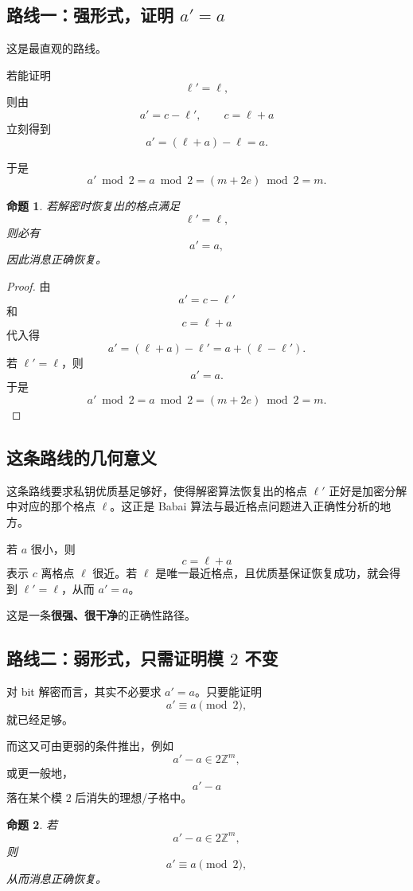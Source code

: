 \documentclass[12pt,a4paper]{article}
\newtheorem{proposition}{命题}
\begin{document}
\subsection{路线一：强形式，证明 \(a'=a\)}

这是最直观的路线。

若能证明
\[
\ell'=\ell,
\]
则由
\[
a' = c-\ell',\qquad c=\ell+a
\]
立刻得到
\[
a' = (\ell+a)-\ell = a.
\]

于是
\[
a'\bmod 2 = a\bmod 2 = (m+2e)\bmod 2 = m.
\]

\begin{proposition}
若解密时恢复出的格点满足
\[
\ell'=\ell,
\]
则必有
\[
a'=a,
\]
因此消息正确恢复。
\end{proposition}

\begin{proof}
由
\[
a' = c-\ell'
\]
和
\[
c=\ell+a
\]
代入得
\[
a' = (\ell+a)-\ell' = a+(\ell-\ell').
\]
若 \(\ell'=\ell\)，则
\[
a'=a.
\]
于是
\[
a'\bmod 2 = a\bmod 2 = (m+2e)\bmod 2 = m.
\]
\end{proof}

\subsection{这条路线的几何意义}

这条路线要求私钥优质基足够好，使得解密算法恢复出的格点 \(\ell'\) 正好是加密分解中对应的那个格点 \(\ell\)。这正是 Babai 算法与最近格点问题进入正确性分析的地方。

若 \(a\) 很小，则
\[
c=\ell+a
\]
表示 \(c\) 离格点 \(\ell\) 很近。若 \(\ell\) 是唯一最近格点，且优质基保证恢复成功，就会得到 \(\ell'=\ell\)，从而 \(a'=a\)。

这是一条\textbf{很强、很干净}的正确性路径。

\subsection{路线二：弱形式，只需证明模 \(2\) 不变}

对 bit 解密而言，其实不必要求 \(a'=a\)。只要能证明
\[
a' \equiv a \pmod 2,
\]
就已经足够。

而这又可由更弱的条件推出，例如
\[
a'-a \in 2\mathbb Z^m,
\]
或更一般地，
\[
a'-a
\]
落在某个模 \(2\) 后消失的理想/子格中。

\begin{proposition}
若
\[
a'-a \in 2\mathbb Z^m,
\]
则
\[
a' \equiv a \pmod 2,
\]
从而消息正确恢复。
\end{proposition}
\end{document}
